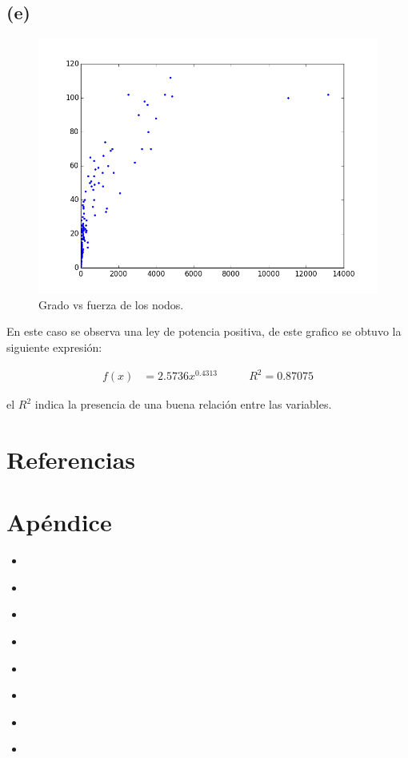 \documentclass[letterpaper]{article}
\newcommand{\python}[2]{
    \begin{itemize}
        \item[]
    \end{itemize}
}
\begin{document}
\subsection*{(e)}

\begin{figure}[H]
  \centering
  \includegraphics[width=.75\linewidth]{img/p9-k-vs-s.png}
  \caption{Grado vs fuerza de los nodos.}
  \label{chart:4}
\end{figure}

En este caso se observa una ley de potencia positiva, de este grafico se obtuvo la siguiente expresión:

\begin{align}
f(x) &= 2.5736x^{0.4313} & \qquad R^{2} = 0.87075
\end{align}

el $R^2$ indica la presencia de una buena relación entre las variables.


\section{Referencias}
\section{Apéndice}

\python{codigos/p1.py}{p1.py}
\python{codigos/p2.py}{p2.py}
\python{codigos/p3.py}{p3.py}
\python{codigos/p4.py}{p4.py}
\python{codigos/p5-1-gnutella.py}{p5-1-gnutella.py}
\python{codigos/p5-2-delfines.py}{p5-2-delfines.py}
\python{codigos/p5-3-erdos-renyi-gnutella.py}{p5-3-erdos-renyi-gnutella.py}
\python{codigos/p5-4-erdos-renyi-delfines.py}{p5-3-erdos-renyi-delfines.py}
\end{document}
